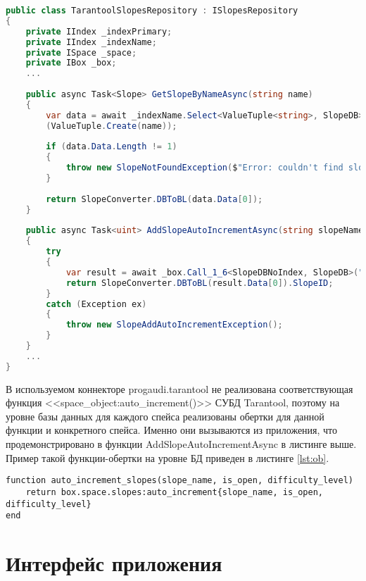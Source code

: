 \captionsetup{justification=centering,singlelinecheck=off}
\begin{lstlisting}[label=lst:slopes_rep, caption=Часть реализации репозитория для доступа к данным спейса slopes из БД, language=csharp]
public class TarantoolSlopesRepository : ISlopesRepository
{
	private IIndex _indexPrimary;
	private IIndex _indexName;
	private ISpace _space;
	private IBox _box;
	...
	
	public async Task<Slope> GetSlopeByNameAsync(string name)
	{
		var data = await _indexName.Select<ValueTuple<string>, SlopeDB>
		(ValueTuple.Create(name));
		
		if (data.Data.Length != 1)
		{
			throw new SlopeNotFoundException($"Error: couldn't find slope with name={name}");
		}
		
		return SlopeConverter.DBToBL(data.Data[0]);
	}
	
	public async Task<uint> AddSlopeAutoIncrementAsync(string slopeName, bool isOpen, uint difficultyLevel)
	{
		try
		{
			var result = await _box.Call_1_6<SlopeDBNoIndex, SlopeDB>("auto_increment_slopes", (new SlopeDBNoIndex(slopeName, isOpen, difficultyLevel)));
			return SlopeConverter.DBToBL(result.Data[0]).SlopeID;
		}
		catch (Exception ex)
		{
			throw new SlopeAddAutoIncrementException();
		}
	}
	...
}
\end{lstlisting}

В используемом коннекторе progaudi.tarantool не реализована соответствующая функция <<space\_object:auto\_increment()>> СУБД Tarantool, поэтому на уровне базы данных для каждого спейса реализованы обертки для данной функции и конкретного спейса. Именно они вызываются из приложения, что продемонстрировано в функции AddSlopeAutoIncrementAsync в листинге выше. Пример такой функции-обертки на уровне БД приведен в листинге \ref{lst:ob}.

\captionsetup{justification=centering,singlelinecheck=off}
\begin{lstlisting}[label=lst:ob, caption=Обертка для функции <<space\_object:auto\_increment()>> и спейса slopes, style=myLuastyle]
function auto_increment_slopes(slope_name, is_open, difficulty_level)
	return box.space.slopes:auto_increment{slope_name, is_open, difficulty_level}
end

\end{lstlisting}

\section{Интерфейс приложения}